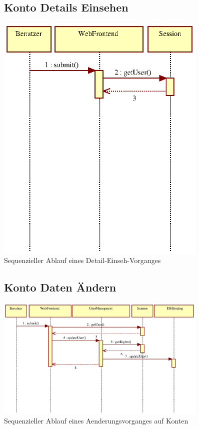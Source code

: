 \documentclass[a4paper,11pt]{scrartcl}
\begin{document}
\begin{figure}[htbp]
\subsection{Konto Details Einsehen}
		\centering
		\includegraphics[width=0.90\textwidth]{images/seq05_KontoDetailsEinsehen.eps}
		\caption{Sequenzieller Ablauf eines Detail-Einseh-Vorganges}
		\label{seq05}
\end{figure}


\begin{figure}[htbp]
\subsection{Konto Daten Ändern}
		\centering
		\includegraphics[width=0.90\textwidth]{images/seq06_KontoDatenAendern.eps}
		\caption{Sequenzieller Ablauf eines Aenderungsvorganges auf Konten}
		\label{seq06}
\end{figure}
\end{document}
